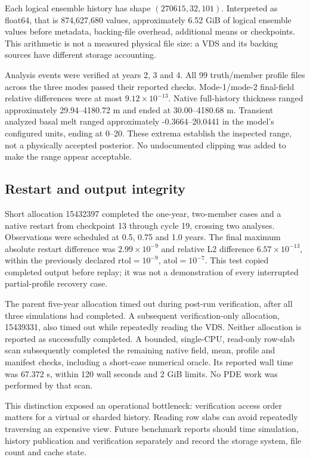 \documentclass[11pt,a4paper]{article}
\begin{document}
Each logical ensemble history has shape \((270615,32,101)\). Interpreted as float64, that is 874,627,680 values, approximately 6.52 GiB of logical ensemble values before metadata, backing-file overhead, additional means or checkpoints. This arithmetic is not a measured physical file size: a VDS and its backing sources have different storage accounting.

Analysis events were verified at years 2, 3 and 4. All 99 truth/member profile files across the three modes passed their reported checks. Mode-1/mode-2 final-field relative differences were at most \(9.12\times10^{-13}\). Native full-history thickness ranged approximately 29.94--4180.72 m and ended at 30.00--4180.68 m. Transient analyzed basal melt ranged approximately -0.3664--20.0441 in the model's configured units, ending at 0--20. These extrema establish the inspected range, not a physically accepted posterior. No undocumented clipping was added to make the range appear acceptable.

\subsection{Restart and output integrity}
Short allocation 15432397 completed the one-year, two-member cases and a native restart from checkpoint 13 through cycle 19, crossing two analyses. Observations were scheduled at 0.5, 0.75 and 1.0 years. The final maximum absolute restart difference was \(2.99\times10^{-9}\) and relative L2 difference \(6.57\times10^{-13}\), within the previously declared \(\mathrm{rtol}=10^{-9}\), \(\mathrm{atol}=10^{-7}\). This test copied completed output before replay; it was not a demonstration of every interrupted partial-profile recovery case.

The parent five-year allocation timed out during post-run verification, after all three simulations had completed. A subsequent verification-only allocation, 15439331, also timed out while repeatedly reading the VDS. Neither allocation is reported as successfully completed. A bounded, single-CPU, read-only row-slab scan subsequently completed the remaining native field, mean, profile and manifest checks, including a short-case numerical oracle. Its reported wall time was 67.372 s, within 120 wall seconds and 2 GiB limits. No PDE work was performed by that scan.

This distinction exposed an operational bottleneck: verification access order matters for a virtual or sharded history. Reading row slabs can avoid repeatedly traversing an expensive view. Future benchmark reports should time simulation, history publication and verification separately and record the storage system, file count and cache state.
\end{document}
